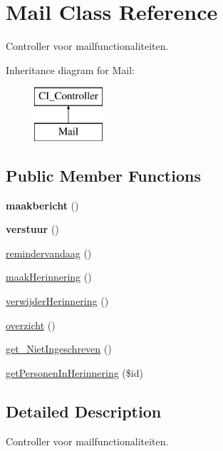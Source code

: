 \hypertarget{class_mail}{}\section{Mail Class Reference}
\label{class_mail}


Controller voor mailfunctionaliteiten.  


Inheritance diagram for Mail\+:\begin{figure}[H]
\begin{center}
\leavevmode
\includegraphics[height=2.000000cm]{class_mail}
\end{center}
\end{figure}
\subsection*{Public Member Functions}
\begin{DoxyCompactItemize}
\item 
\mbox{\label{class_mail_a9e19643f7bd6b63ac867a99a42513790}} 
{\bfseries maakbericht} ()
\item 
\mbox{\label{class_mail_a698adc5d93072946dbb03cb5e8025a92}} 
{\bfseries verstuur} ()
\item 
\mbox{\hyperlink{class_mail_a6b0bf7c864a3999c5b56222deb88874f}{remindervandaag}} ()
\item 
\mbox{\hyperlink{class_mail_a51675a2d0d65414634e3a21067462014}{maak\+Herinnering}} ()
\item 
\mbox{\hyperlink{class_mail_a5870a82a870b3b579d503101494abaf9}{verwijder\+Herinnering}} ()
\item 
\mbox{\hyperlink{class_mail_abb72118b34523cae188c03dc72955d8c}{overzicht}} ()
\item 
\mbox{\hyperlink{class_mail_a981094d50056d958426564d48c95cce1}{get\+\_\+\+Niet\+Ingeschreven}} ()
\item 
\mbox{\hyperlink{class_mail_af56bb11351090ce865a284a2c27ef3bb}{get\+Personen\+In\+Herinnering}} (\$id)
\end{DoxyCompactItemize}


\subsection{Detailed Description}
Controller voor mailfunctionaliteiten. 

